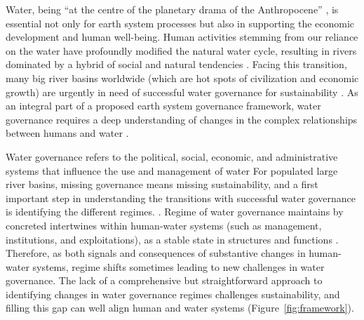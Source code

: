 \label{Intro.}
Water, being ``at the centre of the planetary drama of the Anthropocene'' \cite{gleesonIlluminatingwatercycle2020}, is essential not only for earth system processes but also in supporting the economic development and human well-being.
Human activities stemming from our reliance on the water have profoundly modified the natural water cycle, resulting in rivers dominated by a hybrid of social and natural tendencies
\cite{gleesonIlluminatingwatercycle2020,sivapalanSociohydrologynewscience2012,qinTheoreticalframeworkdualistic2014,abbottwatercycleAnthropocene2019,leviaHomogenizationterrestrialwater2020}.
Facing this transition, many big river basins worldwide (which are hot spots of civilization and economic growth) are urgently in need of successful water governance for sustainability
\cite{bestAnthropogenicstressesworld2019,falkenmarkUnderstandingwaterresilience2019,dibaldassarreSociohydrologyScientificChallenges2019}.
As an integral part of a proposed earth system governance framework, water governance requires a deep understanding of changes in the complex relationships between humans and water
\cite{dibaldassarreSociohydrologyScientificChallenges2019,biermannNavigatingAnthropoceneImproving2012,steffenemergenceevolutionEarth2020}.

Water governance refers to the political, social, economic, and administrative systems that influence the use and management of water %
For populated large river basins, missing governance means missing sustainability, and a first important step in understanding the transitions with successful water governance is identifying the different regimes.
\cite{undpwatergovernancefacilityWaterGovernanceIssue}.
Regime of water governance maintains by concreted intertwines within human-water systems (such as management, institutions, and exploitations), as a stable state in structures and functions
\cite{carpenterEarlyWarningsRegime2011,rochaCascadingregimeshifts2018, gregrCascadingsocialecologicalcosts2020}.
Therefore, as both signals and consequences of substantive changes in human-water systems, regime shifts sometimes leading to new challenges in water governance.
The lack of a comprehensive but straightforward approach to identifying changes in water governance regimes challenges sustainability, and filling this gap can well align human and water systems (Figure~\ref{fig:framework}).

